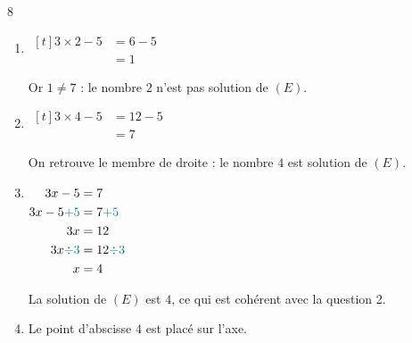 \documentclass[10pt,a4paper]{article}
\begin{document}
\begin{corr}[Guidé]{8}
\begin{enumerate}[leftmargin=*]
    \item \(\begin{aligned}[t] 3\times 2-5&=6-5\\ &=1\end{aligned}\)

    Or \(1\neq 7\) : le nombre \(2\) n'est pas solution de \((E)\).
    \item \(\begin{aligned}[t] 3\times 4-5&=12-5\\ &=7\end{aligned}\)

    On retrouve le membre de droite : le nombre \(4\) est solution de \((E)\).
    \item
    \(\begin{aligned}[t]
    3x-5 &= 7\\
    3x-5\textcolor{teal}{+5} &= 7\textcolor{teal}{+5}\\
    3x &= 12\\
    3x\textcolor{teal}{\div 3} &= 12\textcolor{teal}{\div 3}\\
    x &= 4
    \end{aligned}\)

    La solution de \((E)\) est \(4\), ce qui est cohérent avec la question 2.
    \item Le point d'abscisse \(4\) est placé sur l'axe.
\end{enumerate}
\end{corr}
\end{document}
